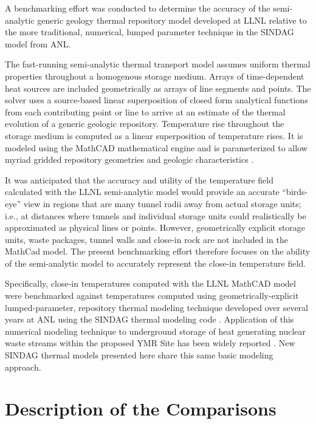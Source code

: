 
A benchmarking effort was conducted to determine the accuracy of the 
semi-analytic generic geology thermal repository model developed at 
\gls{LLNL}\cite{hardin_generic_2011,greenberg_investigations_2012,greenberg_application_2012} 
relative to the more traditional, numerical, lumped parameter technique in the 
\gls{SINDAG} model from \gls{ANL}.

The fast-running semi-analytic thermal transport model assumes uniform thermal 
properties throughout a homogenous storage medium. Arrays of time-dependent heat 
sources are included geometrically as arrays of line segments and points.  The 
solver uses a source-based linear superposition of closed form analytical 
functions from each contributing point or line to arrive at an estimate of the 
thermal evolution of a generic geologic repository.  Temperature rise throughout 
the storage medium is computed as a linear superposition of temperature rises.  
It is modeled using the MathCAD mathematical engine and is parameterized to 
allow myriad gridded repository geometries and geologic characteristics 
\cite{ptc_mathcad_2010}.

It was anticipated that the accuracy and utility of the temperature field
calculated with the \gls{LLNL} semi-analytic model would provide an accurate 
``birds-eye''
view in regions that are many tunnel radii away from actual storage units;
i.e., at distances where tunnels and individual storage units could
realistically be approximated as physical lines or points. 
However, geometrically explicit storage units, waste packages, tunnel
walls and close-in rock are not included in the MathCad model. 
The present benchmarking effort therefore focuses on the ability of the 
semi-analytic model to accurately represent the close-in
temperature field.

Specifically, close-in temperatures computed with the \gls{LLNL} MathCAD model 
were benchmarked against temperatures computed using geometrically-explicit 
lumped-parameter, repository thermal modeling technique developed over several 
years at \gls{ANL} using the \gls{SINDAG} thermal modeling code 
\cite{gaski_sinda_1987}. Application of this numerical modeling technique to 
underground storage of heat generating nuclear waste streams within the proposed 
\gls{YMR} Site has been widely reported \cite{wigeland_separations_2006}.  New 
\gls{SINDAG} thermal models presented here share this same basic modeling 
approach. 

\section{Description of the Comparisons}

